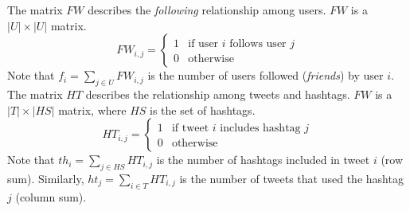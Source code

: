The matrix $FW$ describes the \emph{following} relationship among users. $FW$ is a $|U| \times |U|$ matrix.
\begin{equation}\label{eq:following_rel}
FW_{i,j} = \begin{cases}
1 & \text{if user } i \text{ follows user } j \\
0 & \text{otherwise}
\end{cases}
\end{equation}
Note that $f_i = \sum_{j \in U} FW_{i,j}$ is the number of users followed (\emph{friends}) by user $i$. \\

The matrix $HT$ describes the relationship among tweets and hashtags. $FW$ is a $|T| \times |HS|$ matrix, where $HS$ is the set of hashtags.
\begin{equation}\label{eq:hashtags_rel}
HT_{i,j} = \begin{cases}
1 & \text{if tweet } i \text{ includes hashtag } j \\
0 & \text{otherwise}
\end{cases}
\end{equation}
Note that $th_i = \sum_{j \in HS} HT_{i,j}$ is the number of hashtags included in tweet $i$ (row sum). Similarly, $ht_j = \sum_{i \in T} HT_{i,j}$ is the number of tweets that used the hashtag $j$ (column sum).